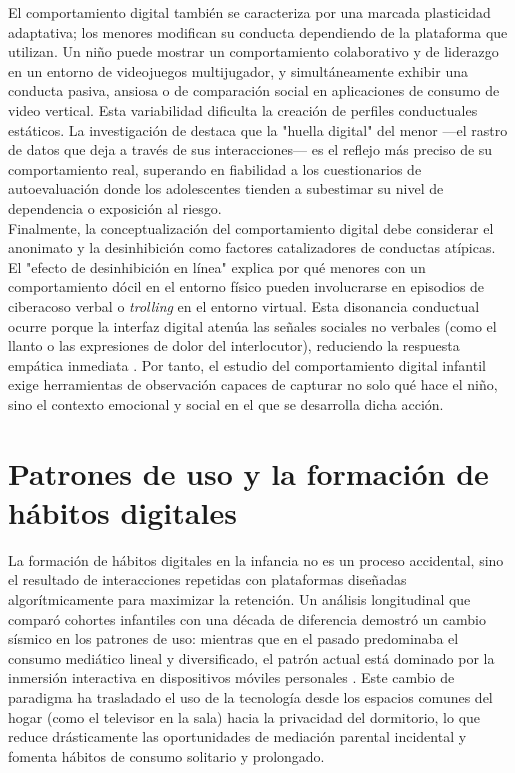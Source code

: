 El comportamiento digital también se caracteriza por una marcada plasticidad adaptativa; los menores modifican su conducta dependiendo de la plataforma que utilizan. Un niño puede mostrar un comportamiento colaborativo y de liderazgo en un entorno de videojuegos multijugador, y simultáneamente exhibir una conducta pasiva, ansiosa o de comparación social en aplicaciones de consumo de video vertical. Esta variabilidad dificulta la creación de perfiles conductuales estáticos. La investigación de \cite{tintori_childrens_2023} destaca que la "huella digital" del menor —el rastro de datos que deja a través de sus interacciones— es el reflejo más preciso de su comportamiento real, superando en fiabilidad a los cuestionarios de autoevaluación donde los adolescentes tienden a subestimar su nivel de dependencia o exposición al riesgo.\\

Finalmente, la conceptualización del comportamiento digital debe considerar el anonimato y la desinhibición como factores catalizadores de conductas atípicas. El "efecto de desinhibición en línea" explica por qué menores con un comportamiento dócil en el entorno físico pueden involucrarse en episodios de ciberacoso verbal o \textit{trolling} en el entorno virtual. Esta disonancia conductual ocurre porque la interfaz digital atenúa las señales sociales no verbales (como el llanto o las expresiones de dolor del interlocutor), reduciendo la respuesta empática inmediata \cite{zhu_cyberbullying_2021}. Por tanto, el estudio del comportamiento digital infantil exige herramientas de observación capaces de capturar no solo qué hace el niño, sino el contexto emocional y social en el que se desarrolla dicha acción.\\

\section{Patrones de uso y la formación de hábitos digitales}

La formación de hábitos digitales en la infancia no es un proceso accidental, sino el resultado de interacciones repetidas con plataformas diseñadas algorítmicamente para maximizar la retención. Un análisis longitudinal que comparó cohortes infantiles con una década de diferencia demostró un cambio sísmico en los patrones de uso: mientras que en el pasado predominaba el consumo mediático lineal y diversificado, el patrón actual está dominado por la inmersión interactiva en dispositivos móviles personales \cite{bohnert_emerging_2021}. Este cambio de paradigma ha trasladado el uso de la tecnología desde los espacios comunes del hogar (como el televisor en la sala) hacia la privacidad del dormitorio, lo que reduce drásticamente las oportunidades de mediación parental incidental y fomenta hábitos de consumo solitario y prolongado.\\

